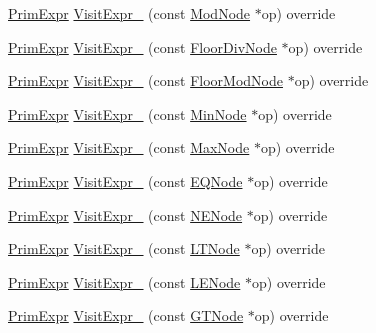 \begin{DoxyCompactItemize}
\item 
\hyperlink{classtvm_1_1PrimExpr}{Prim\+Expr} \hyperlink{classtvm_1_1tir_1_1ExprMutator_abef01921a361e7f5277611c7fcc090a3}{Visit\+Expr\+\_\+} (const \hyperlink{classtvm_1_1tir_1_1ModNode}{Mod\+Node} $\ast$op) override
\item 
\hyperlink{classtvm_1_1PrimExpr}{Prim\+Expr} \hyperlink{classtvm_1_1tir_1_1ExprMutator_a043a4dd18fa1f63ab32a714a5c2a8fae}{Visit\+Expr\+\_\+} (const \hyperlink{classtvm_1_1tir_1_1FloorDivNode}{Floor\+Div\+Node} $\ast$op) override
\item 
\hyperlink{classtvm_1_1PrimExpr}{Prim\+Expr} \hyperlink{classtvm_1_1tir_1_1ExprMutator_a68b5c138ad08c2b490cde5b0dafae044}{Visit\+Expr\+\_\+} (const \hyperlink{classtvm_1_1tir_1_1FloorModNode}{Floor\+Mod\+Node} $\ast$op) override
\item 
\hyperlink{classtvm_1_1PrimExpr}{Prim\+Expr} \hyperlink{classtvm_1_1tir_1_1ExprMutator_a44047f3394527b92a7b9b2c09c3d1383}{Visit\+Expr\+\_\+} (const \hyperlink{classtvm_1_1tir_1_1MinNode}{Min\+Node} $\ast$op) override
\item 
\hyperlink{classtvm_1_1PrimExpr}{Prim\+Expr} \hyperlink{classtvm_1_1tir_1_1ExprMutator_aef327502870481ce2d92592b03c5e130}{Visit\+Expr\+\_\+} (const \hyperlink{classtvm_1_1tir_1_1MaxNode}{Max\+Node} $\ast$op) override
\item 
\hyperlink{classtvm_1_1PrimExpr}{Prim\+Expr} \hyperlink{classtvm_1_1tir_1_1ExprMutator_aa03b672865f654dd5f1c78fb012f1061}{Visit\+Expr\+\_\+} (const \hyperlink{classtvm_1_1tir_1_1EQNode}{E\+Q\+Node} $\ast$op) override
\item 
\hyperlink{classtvm_1_1PrimExpr}{Prim\+Expr} \hyperlink{classtvm_1_1tir_1_1ExprMutator_aa587c243decbe1667b93050e7e6128ff}{Visit\+Expr\+\_\+} (const \hyperlink{classtvm_1_1tir_1_1NENode}{N\+E\+Node} $\ast$op) override
\item 
\hyperlink{classtvm_1_1PrimExpr}{Prim\+Expr} \hyperlink{classtvm_1_1tir_1_1ExprMutator_abba3fcf085a7be3337ef56765c7ed935}{Visit\+Expr\+\_\+} (const \hyperlink{classtvm_1_1tir_1_1LTNode}{L\+T\+Node} $\ast$op) override
\item 
\hyperlink{classtvm_1_1PrimExpr}{Prim\+Expr} \hyperlink{classtvm_1_1tir_1_1ExprMutator_a0e9280d0c56c074e4bc67a207dfc0721}{Visit\+Expr\+\_\+} (const \hyperlink{structtvm_1_1tir_1_1LENode}{L\+E\+Node} $\ast$op) override
\item 
\hyperlink{classtvm_1_1PrimExpr}{Prim\+Expr} \hyperlink{classtvm_1_1tir_1_1ExprMutator_a03165c7d449104444daf8fb2329ed3f3}{Visit\+Expr\+\_\+} (const \hyperlink{classtvm_1_1tir_1_1GTNode}{G\+T\+Node} $\ast$op) override

\end{DoxyCompactItemize}
